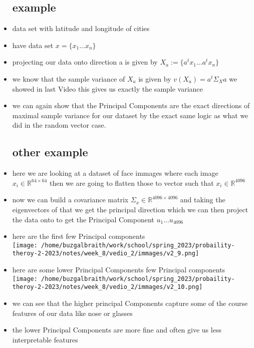 \documentclass{article}
\begin{document}
\begin{itemize}
\subsection*{example}
\item data set with latitude and longitude of cities 
\item have data set $x=\{x_1...x_n\}$
\item projecting our data onto direction a  is given by $X_{a}:=\{a^tx_1...a^tx_n\}$
\item we know that the sample variance of $X_a$ is given by $v(X_a)=a^t\Sigma_X a$ we showed in last Video this gives us exactly the sample variance
\item we can again show that the Principal Components are the exact directions of maximal sample variance for our dataset by the exact same logic as what we did in the random vector case. 
\subsection*{other example}
\item here we are looking at a dataset of face immages where each image $x_i\in \mathbb{R}^{64\times 64}$ then we are going to flatten those to vector such that $x_i\in \mathbb{R}^{4096}$
\item now we can build a covariance matrix $\Sigma_{x}\in \mathbb{R}^{4096\times 4096}$ and taking the eigenvectors of that we get the principal direction which we can then project the data onto to get the Principal Component $u_1...u_{4096}$
\item here are the first few Principal components \\ \texttt{[image: /home/buzgalbraith/work/school/spring\_2023/probaility-theroy-2-2023/notes/week\_8/vedio\_2/immages/v2\_9.png]}
\item here are some lower Principal Components few Principal components \\ \texttt{[image: /home/buzgalbraith/work/school/spring\_2023/probaility-theroy-2-2023/notes/week\_8/vedio\_2/immages/v2\_10.png]}
\item we can see that the higher principal Components capture some of the course features of our data like nose or glasses 
\item the lower Principal Components are more fine and often give us less interpretable features 
\end{itemize}
\end{document}

